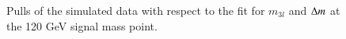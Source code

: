 \begin{figure}[H!]
\begin{minipage}[c]{\textwidth}
{		
	}
  \caption{Pulls of the simulated data with respect to the fit for $m_{3l}$ and $\Delta m$ at the 120 GeV signal mass point. }
  \label{fig:Pull}
\end{minipage}
\end{figure}
